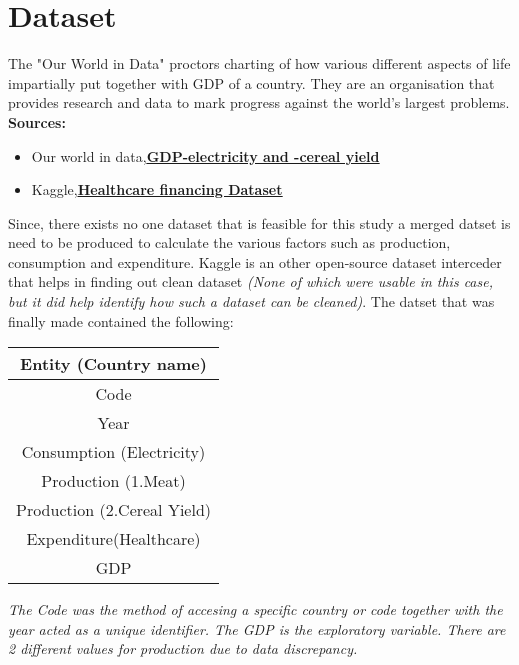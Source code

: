 \documentclass[conference]{IEEEtran}
\begin{document}
\section{Dataset}
The "Our World in Data" proctors charting of how various different aspects of life impartially put together with GDP of a country. They are an organisation that provides research and data to mark progress against the world's largest problems.
\textbf{Sources:}\\
\begin{itemize}
    \item Our world in data,\textbf{\href{https://ourworldindata.org/}{\underline{GDP-electricity and -cereal yield}}}
    \item Kaggle,\textbf{\href{https://www.kaggle.com/datasets/programmerrdai/financing-healthcare}{\underline{Healthcare financing Dataset}}}
\end{itemize}
Since, there exists no one dataset that is feasible for this study a merged datset is need to be produced to calculate the various factors such as production, consumption and expenditure.
Kaggle is an other open-source dataset interceder that helps in finding out clean dataset \emph{(None of which were usable in this case, but it did help identify how such a dataset can be cleaned)}.
The datset that was finally made contained the following:
\begin{center}
    \begin{tabular}{ |c| }
        \hline
        Entity (Country name)       \\
        \hline
        Code                        \\
        \hline
        Year                        \\
        \hline
        Consumption (Electricity)   \\
        \hline
        Production (1.Meat)         \\
        Production (2.Cereal Yield) \\
        \hline
        Expenditure(Healthcare)     \\
        \hline
        GDP                         \\
        \hline
    \end{tabular}
\end{center}
\bigskip
\emph{The Code was the method of accesing a specific country or code together with the year acted as a unique identifier. The GDP is the exploratory variable. There are 2 different values for production due to data discrepancy.}
\end{document}
